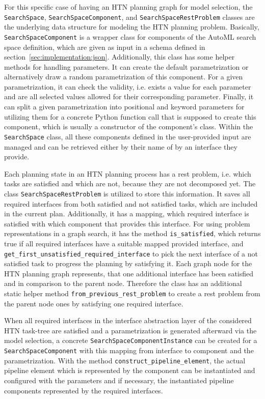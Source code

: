 For this specific case of having an HTN planning graph for model selection, the \texttt{SearchSpace}, \texttt{SearchSpaceComponent}, and \texttt{SearchSpaceRestProblem} classes are the underlying data structure for modeling the HTN planning problem.\newline
Basically, \texttt{SearchSpaceComponent} is a wrapper class for components of the AutoML search space definition, which are given as input in a schema defined in section~\ref{sec:implementation:json}.
Additionally, this class has some helper methods for handling parameters.
It can create the default parametrization or alternatively draw a random parametrization of this component.
For a given parametrization, it can check the validity, i.e. exists a value for each parameter and are all selected values allowed for their corresponding parameter.
Finally, it can split a given parametrization into positional and keyword parameters for utilizing them for a concrete Python function call that is supposed to create this component, which is usually a constructor of the component's class.\newline
Within the \texttt{SearchSpace} class, all these components defined in the user-provided input are managed and can be retrieved either by their name of by an interface they provide.

Each planning state in an HTN planning process has a rest problem, i.e. which tasks are satisfied and which are not, because they are not decomposed yet.
The class \texttt{SearchSpaceRestProblem} is utilized to store this information.
It saves all required interfaces from both satisfied and not satisfied tasks, which are included in the current plan.
Additionally, it has a mapping, which required interface is satisfied with which component that provides this interface.\newline
For using problem representations in a graph search, it has the method \texttt{is\_satisfied}, which returns true if all required interfaces have a suitable mapped provided interface, and \texttt{get\_first\_unsatisfied\_required\_interface} to pick the next interface of a not satisfied task to progress the planning by satisfying it.
Each graph node for the HTN planning graph represents, that one additional interface has been satisfied and in comparison to the parent node.
Therefore the class has an additional static helper method \texttt{from\_previous\_rest\_problem} to create a rest problem from the parent node ones by satisfying one required interface.

When all required interfaces in the interface abstraction layer of the considered HTN task-tree are satisfied and a parametrization is generated afterward via the model selection, a concrete \texttt{SearchSpaceComponentInstance} can be created for a \texttt{SearchSpaceComponent} with this mapping from interface to component and the parametrization.
With the method \texttt{construct\_pipeline\_element}, the actual pipeline element which is represented by the component can be instantiated and configured with the parameters and if necessary, the instantiated pipeline components represented by the required interfaces.


